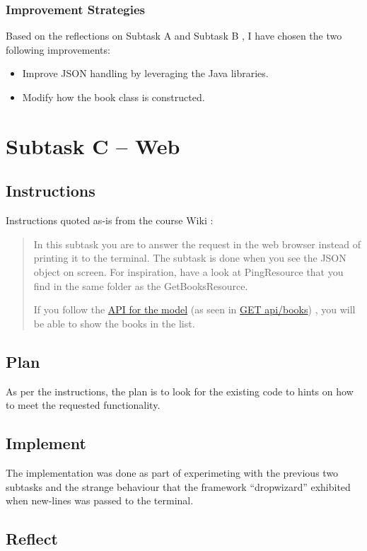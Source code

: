 \subsubsection{Improvement Strategies}
Based on the reflections on Subtask A \cite{task-1a-reflect} and Subtask B
\cite{task-1b-reflect}, I have chosen the two following improvements:

\begin{itemize}
  \item Improve JSON handling by leveraging the Java libraries.
  \item Modify how the book class is constructed.
\end{itemize}





\section{Subtask C -- Web}\label{subtask-c-web}
\subsection{Instructions}\label{task-1-instructions}
Instructions quoted as-is from the course Wiki \cite{1dv600:lab1:instructions}:

\begin{quote}
  In this subtask you are to answer the request in the web browser instead of
  printing it to the terminal. The subtask is done when you see the JSON object
  on screen. For inspiration, have a look at PingResource that you find in the
  same folder as the GetBooksResource. 

  If you follow the 
  \href{https://htmlpreview.github.io/?https://github.com/tobias-dv-lnu/1dv600-lab/blob/master/api-specification/api-specification.html}{API for the model}
  (as seen in 
  \href{https://htmlpreview.github.io/?https://github.com/tobias-dv-lnu/1dv600-lab/blob/master/api-specification/api-specification.html\#books-get}{GET api/books})
  , you will be able to show the books in the list.
\end{quote}


\subsection{Plan}\label{task-1c-plan}
As per the instructions, the plan is to look for the existing code to hints
on how to meet the requested functionality.

\subsection{Implement}\label{task-1c-implement}
The implementation was done as part of experimeting with the previous two
subtasks and the strange behaviour that the framework ``dropwizard'' exhibited
when new-lines was passed to the terminal.

\subsection{Reflect}\label{task-1c-reflect}
